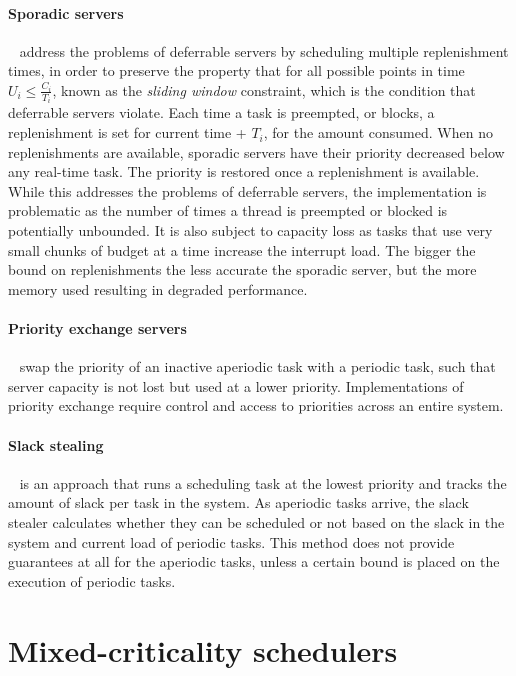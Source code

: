 \paragraph{Sporadic servers}~\citep{Sprunt_SL_89a}\label{p:sporadic} address the problems of
deferrable servers by scheduling multiple replenishment times, in order to preserve the property
that for all possible points in time $U_{i} \leq \frac{C_{i}}{T_{i}}$, known as the \emph{sliding window} constraint, which
is the condition that deferrable servers violate.  Each time a task is preempted, or blocks, a
replenishment is set for current time + $T_{i}$, for the amount consumed.  When no replenishments are
available, sporadic servers have their priority decreased below any real-time task.  The priority is
restored once a replenishment is available.  While this addresses the problems of deferrable
servers, the implementation is problematic as the number of times a thread is preempted or blocked
is potentially unbounded.  It is also subject to capacity loss as tasks that use very small chunks
of budget at a time increase the interrupt load.  The bigger the bound on replenishments the less
accurate the sporadic server, but the more memory used resulting in degraded performance.

\paragraph{Priority exchange servers}~\citep{Sprunt_SL_89a} swap the priority of an inactive
aperiodic task with a periodic task, such that server capacity is not lost but used at a lower
priority.  Implementations of priority exchange require control and access to priorities across an
entire system.

\paragraph{Slack stealing}~\citep{Ramos_Thuel_Lehoczky_93} is an approach that runs a scheduling
task at the lowest priority and tracks the amount of slack per task in the system.  As aperiodic
tasks arrive, the slack stealer calculates whether they can be scheduled or not based on the slack
in the system and current load of periodic tasks.  This method does not provide guarantees at all
for the aperiodic tasks, unless a certain bound is placed on the execution of periodic tasks.

\section{Mixed-criticality schedulers}

